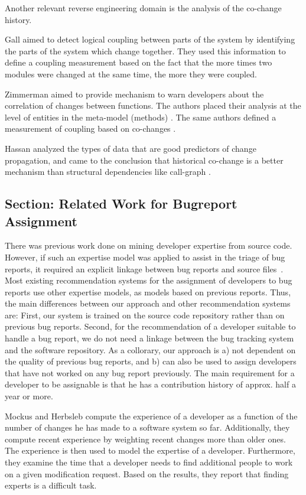 Another relevant reverse engineering domain is the analysis of the co-change history.

Gall \etal aimed to detect logical coupling between parts of the system \cite{Gall98a} by identifying the parts of the system which change together. They used this information to define a coupling measurement based on the fact that the more times two modules were changed at the same time, the more they were coupled.

Zimmerman \etal aimed to provide mechanism to warn developers about the correlation of changes between functions. The authors placed their analysis at the level of entities in the meta-model (\eg methods) \cite{Zimm04a}. The same authors defined a measurement of coupling based on co-changes \cite{Zimm03a}.

Hassan \etal analyzed the  types of data that are good predictors of change propagation, and came to the conclusion that historical co-change is a better mechanism than structural dependencies like call-graph \cite{Hass04a}.

\subsection{Section: Related Work for Bugreport Assignment}\label{sec:relatedwork}

There was previous work done on mining developer expertise from source code. However, if such an expertise model was applied to assist in the triage of bug reports, it required an explicit linkage between bug reports and source files~\cite{Anvik07}. Most existing recommendation systems for the assignment of developers to bug reports use other expertise models, as \eg models based on previous reports. Thus, the main differences between our approach and other recommendation systems are: First, our system is trained on the source code repository rather than on previous bug reports. Second, for the recommendation of a developer suitable to handle a bug report, we do not need a linkage between the bug tracking system and the software repository. As a collorary, our approach is a) not dependent on the quality of previous bug reports, and b) can also be used to assign developers that have not worked on any bug report previously. The main requirement for a developer to be assignable is that he has a contribution history of approx. half a year or more.

Mockus and Herbsleb \cite{Mock02b} compute the experience of a developer as a function of the number of changes he has made to a software system so far. Additionally, they compute recent experience by weighting recent changes more than older ones. The experience is then used to model the expertise of a developer. Furthermore, they examine the time that a developer needs to find additional people to work on a given modification request. Based on the results, they report that finding experts is a difficult task.

